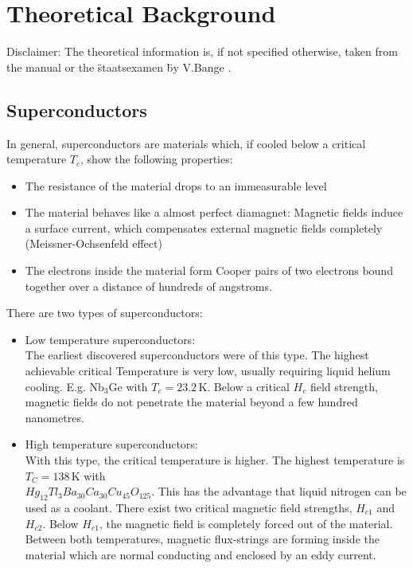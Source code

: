 \section{Theoretical Background}
Disclaimer: The theoretical information is, if not specified otherwise, taken from the manual \cite{anleitung}  or the \" staatsexamen \" by V.Bange \cite{staatsex_squid}.
\subsection{Superconductors}
In general, superconductors are materials which, if cooled below a critical temperature $T_c$, show the following properties:
\begin{itemize}

	\item The resistance of the material drops to an immeasurable level
	\item The material behaves like a almost perfect diamagnet: Magnetic fields induce a surface current, which compensates external magnetic fields completely (Meissner-Ochsenfeld effect)
	\item The electrons inside the material form Cooper pairs of two electrons bound together over a distance of hundreds of angstroms.
	
\end{itemize}
There are two types of superconductors: 
\begin{itemize}
	\item Low temperature superconductors:\\
	 The earliest discovered  superconductors were of this type. The highest achievable critical Temperature is very low, usually requiring liquid helium cooling. E.g. $\text{Nb}_3\text{Ge}$ with $T_c=23.2\,$K.
	Below a critical $H_c$ field strength, magnetic fields do not penetrate the material beyond a
	few hundred nanometres.
	\item High temperature superconductors: \\
	With this type, the critical temperature is higher. The highest temperature is   $T_C=138\,$K with\\
	$Hg_{12}Tl_{3}Ba_{30}Ca_{30}Cu_{45}O_{125}$.
	 This has the advantage that liquid nitrogen can be used as a coolant.
	There exist two critical magnetic field strengths, $H_{c1}$ and $H_{c2}$. Below $H_{c1}$, the magnetic field is completely forced out of the material. Between both temperatures, magnetic flux-strings are forming inside the material which are normal conducting and enclosed by an eddy current.
\end{itemize}
